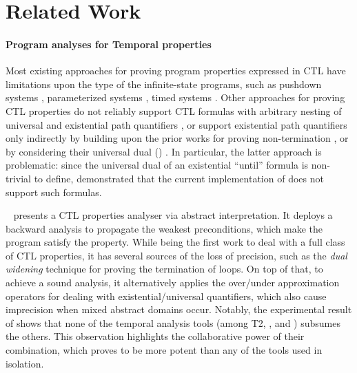 \section{Related Work}
\label{related_work}




\vspace{-2mm}
\noindent\paragraph{\textbf{Program analyses for Temporal properties}} 

Most existing approaches for proving
program properties expressed in CTL have limitations upon the type of the infinite-state programs, such as pushdown systems \cite{DBLP:journals/iandc/EsparzaKS03}, parameterized
systems \cite{DBLP:conf/cav/EmersonN96}, timed systems \cite{alur1994theory}. 
Other approaches for proving CTL properties do not reliably support CTL formulas with arbitrary nesting of universal and existential path quantifiers \cite{DBLP:conf/cav/GurfinkelWC06,DBLP:conf/cav/CookKV11}, 
or support existential path quantifiers only indirectly by building upon the prior works 
for proving non-termination \cite{DBLP:conf/popl/GuptaHMRX08}, or by considering their universal dual (\terminator) \cite{DBLP:conf/fmcad/CookKP14}. In particular, the latter approach is problematic: since the universal dual of an existential ``until'' formula is non-trivial to define, \citet{DBLP:conf/sas/UrbanU018} demonstrated that the current implementation of \terminator does not support such formulas. 

\function~\cite{DBLP:conf/sas/UrbanU018} presents a CTL properties analyser via abstract interpretation. It deploys a backward analysis to propagate the weakest preconditions, which make the program satisfy the property. While being the first work to deal with a full class of CTL properties, it has several sources of the loss of precision, such as the \emph{dual widening} \cite{DBLP:conf/tacas/CourantU17} technique for proving the termination of loops. On top of that, to achieve a sound analysis, it alternatively applies the over/under approximation operators for dealing with existential/universal quantifiers, which also cause imprecision when mixed abstract domains occur. 
Notably, the experimental result of \function shows that none of the temporal analysis tools (among T2, \ultimate, and \function) subsumes the others. 
This observation highlights the collaborative power of their combination, which proves to be more potent than any of the tools used in isolation. 




